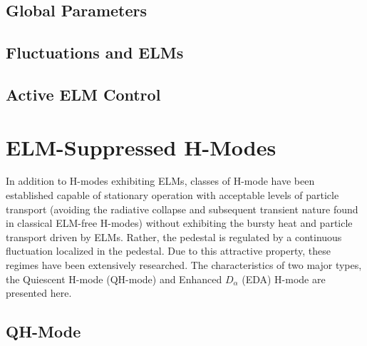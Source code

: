 \subsection{Global Parameters}\label{subsec:hcr_elmy_ped}

\subsection{Fluctuations and ELMs}\label{subsec:hcr_elmy_fluct}

\subsection{Active ELM Control}\label{subsec:hcr_elmy_control}

\nicesectionending

\section{ELM-Suppressed H-Modes}\label{sec:hcr_elmsuppressed}

In addition to H-modes exhibiting ELMs, classes of H-mode have been established capable of stationary operation with acceptable levels of particle transport (avoiding the radiative collapse and subsequent transient nature found in classical ELM-free H-modes) without exhibiting the bursty heat and particle transport driven by ELMs.  Rather, the pedestal is regulated by a continuous fluctuation localized in the pedestal.  Due to this attractive property, these regimes have been extensively researched.  The characteristics of two major types, the Quiescent H-mode (QH-mode) and Enhanced $D_\alpha$ (EDA) H-mode are presented here.

\subsection{QH-Mode}\label{subsec:hcr_qh}

